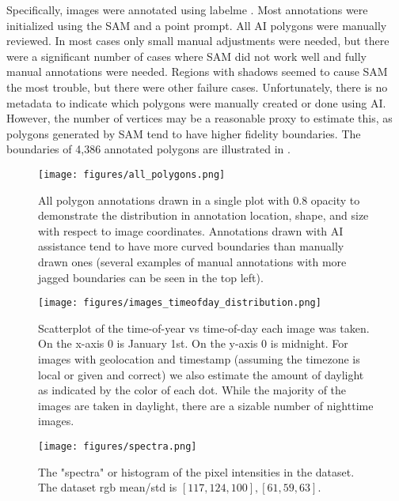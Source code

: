 \documentclass[10pt,twocolumn,letterpaper]{article}
\begin{document}
Specifically, images were annotated using labelme \cite{wada_labelmeailabelme_nodate}. 
Most annotations were initialized using the SAM and a point prompt. 
All AI polygons were manually reviewed. In most cases only small manual
adjustments were needed, but there were a significant number of cases where SAM
did not work well and fully manual annotations were needed.
Regions with shadows seemed to cause SAM the most trouble, but there were other
failure cases. Unfortunately, there is no metadata to indicate which polygons
were manually created or done using AI.  However, the number of vertices may be
a reasonable proxy to estimate this, as polygons generated by SAM tend to have
higher fidelity boundaries.  The boundaries of 4,386 annotated polygons are
illustrated in .


\begin{figure}[ht]
\centering
\texttt{[image: figures/all\_polygons.png]}
\caption[]{
    All polygon annotations drawn in a single plot with 0.8 opacity to
    demonstrate the distribution in annotation location, shape, and size with
    respect to image coordinates. Annotations drawn with AI
    assistance tend to have more curved boundaries than manually drawn ones
    (several examples of manual annotations with more jagged boundaries can be
    seen in the top left).
}
\label{fig:AllPolygons}
\end{figure}

\begin{figure}[ht]
\centering
\texttt{[image: figures/images\_timeofday\_distribution.png]}
\caption[]{
    Scatterplot of the time-of-year vs time-of-day each image was taken. On the
    x-axis 0 is January 1st. On the y-axis 0 is midnight. For images with
    geolocation and timestamp (assuming the timezone is local or given and
    correct) we also estimate the amount of daylight as indicated by the color
    of each dot. While the majority of the images are taken in daylight, there
    are a sizable number of nighttime images.
}
\label{fig:TimeOfDayDistribution}
\end{figure}

\begin{figure}[ht]
\centering
\texttt{[image: figures/spectra.png]}
\caption[]{
    The "spectra" or histogram of the pixel intensities in the dataset. 
    The dataset rgb  mean/std is $[117, 124, 100], [61, 59, 63]$.
}
\label{fig:spectra}
\end{figure}
\end{document}
